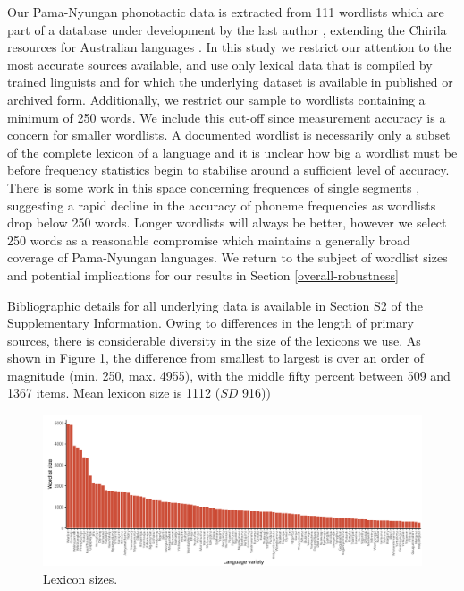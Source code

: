 Our Pama-Nyungan phonotactic data is extracted from 111 wordlists which are part of a database under development by the last author \autocite{round_ausphon-lexicon_2017}, extending the Chirila resources for Australian languages \autocite{bowern_chirila:_2016}. In this study we restrict our attention to the most accurate sources available, and use only lexical data that is compiled by trained linguists and for which the underlying dataset is available in published or archived form. Additionally, we restrict our sample to wordlists containing a minimum of 250 words. We include this cut-off since measurement accuracy is a concern for smaller wordlists. A documented wordlist is necessarily only a subset of the complete lexicon of a language and it is unclear how big a wordlist must be before frequency statistics begin to stabilise around a sufficient level of accuracy. There is some work in this space concerning frequences of single segments \autocite{dockum_swadesh_2019}, suggesting a rapid decline in the accuracy of phoneme frequencies as wordlists drop below 250 words. Longer wordlists will always be better, however we select 250 words as a reasonable compromise which maintains a generally broad coverage of Pama-Nyungan languages. We return to the subject of wordlist sizes and potential implications for our results in Section \ref{overall-robustness}

Bibliographic details for all underlying data is available in Section S2 of the Supplementary Information. Owing to differences in the length of primary sources, there is considerable diversity in the size of the lexicons we use. As shown in Figure \ref{fig:lex-size}, the difference from smallest to largest is over an order of magnitude (min. 250, max. 4955), with the middle fifty percent between 509 and 1367 items. Mean lexicon size is 1112 (\(SD\) 916))

\begin{figure}

{\centering \includegraphics[width=1\linewidth]{fig/wordlist_sizes} 

}

\caption{Lexicon sizes.}\label{fig:lex-size}
\end{figure}

